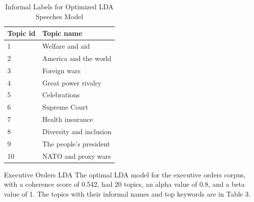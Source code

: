 \documentclass{article}
\begin{document}
{{\begin{table}[H]
	\caption{Informal Labels for Optimized LDA Speeches Model}
	\centering
	\begin{tabular}{ll}
		\toprule
		\midrule
		Topic id  & Topic name \\
		\midrule
		\midrule
		1 & Welfare and aid \\
		\midrule
		2 & America and the world \\
		\midrule
		3 & Foreign wars \\
		\midrule
		4 & Great power rivalry \\
		\midrule
		5 & Celebrations \\
		\midrule
		6 & Supreme Court \\
		\midrule
		7 & Health insurance \\
		\midrule
		8 & Diversity and inclusion \\
		\midrule
		9 & The people’s president \\
		\midrule
		10 & NATO and proxy wars \\
		\bottomrule
	\end{tabular}
\end{table}

Executive Orders LDA
The optimal LDA model for the executive orders corpus, with a coherence score of 0.542, had 20 topics, an alpha value of 0.8, and a beta value of 1. The topics with their informal names and top keywords are in Table 3. 

}}
\end{document}
